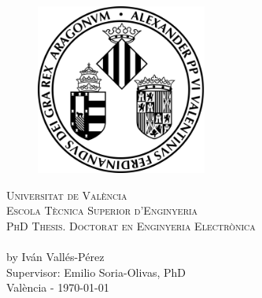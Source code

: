 \makeatletter
\begin{titlepage}

	\begin{figure}[t]
		\centering\includegraphics[width=0.5\textwidth]{titlepage/images/logo}
	\end{figure}
	
	\begin{center}
	\textsc{ \LARGE{Universitat de València \\}}
	\textsc{ \LARGE{Escola Tècnica Superior d'Enginyeria \\ }}
	\vspace{5mm}
	{\textsc{PhD Thesis. Doctorat en Enginyeria Electrònica}\\}
	\vspace{40mm}
	\LARGE{\textbf{\@title}\\}
	\vspace{5mm}
	{\large by Iván Vallés-Pérez \\}
	\vspace{40mm}
	\large{Supervisor: Emilio Soria-Olivas, PhD \\ }
	\large{València - \monthyeardate\today }
	\end{center}

\end{titlepage}
\makeatother